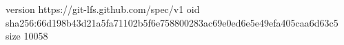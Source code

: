version https://git-lfs.github.com/spec/v1
oid sha256:66d198b43d21a5fa71102b5f6e758800283ac69e0ed6e5e49efa405caa6d63c5
size 10058

